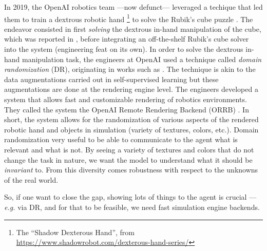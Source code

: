 \documentclass[12pt,a4paper]{article}
\begin{document}
In 2019, the OpenAI robotics team ---now defunct--- leveraged a techique that led
them to train a dextrous robotic hand \footnote{The ``Shadow Dexterous Hand'', from
\url{https://www.shadowrobot.com/dexterous-hand-series/}}
to solve the Rubik's cube puzzle \cite{OpenAI2019-vy}.
The endeavor consisted in first \textit{solving} the dextrous in-hand manipulation of the cube,
which was reported in \cite{OpenAI2018-sm}, before integrating an off-the-shelf Rubik's cube
solver into the system (engineering feat on its own).
In order to solve the dextrous in-hand manipulation task, the engineers at OpenAI used a
technique called \emph{domain randomization} (DR), originating in works such as
\cite{Tobin2017-ir, Tan2018-ux}.
The technique is akin to the data augmentations carried out in self-supervised learning
but these augmentations are done at the rendering engine level. The engineers developed a
system that allows fast and customizable rendering of robotics environments. They called the
system the OpenAI Remote Rendering Backend (ORRB) \cite{Chociej2019-ot}.
In short, the system allows for the randomization of various aspects of the rendered robotic
hand and objects in simulation (variety of textures, colors, etc.).
Domain randomization very useful to be able to communicate to the agent what is relevant and what
is not. By seeing a variety of textures and colors that do not change the task in nature, we
want the model to understand what it should be \emph{invariant} to.
From this diversity comes robustness with respect to the unknowns of the real world.

So, if one want to close the gap, showing lots of things to the agent is crucial
--- \textit{e.g.} via DR, and for that to be feasible, we need fast simulation engine backends.


\begin{comment}
    learning)

problem of character animation in rendering engine is almost identical
    an advantage they have is that game engines do not car as much about contacts being sharp
    usage of dampeners that make contact smooth --making them technically infringe physics
    those are usually very fast and done by game studios (so run on GPU), but clear trade-off

loco sims that are high fidelity and well-vetted are all CPU-based
    GPU-based sims are considerably faster but some operations in locomotion model primitives
    can not be done via big matrix multiplications and are therefore not able to leverage the
    capabilities of GPU, which is why those sims have not been ported to GPU as of yet
    BRAX/MLX might be getting there very soon, so it is very important to keep an eye on those
    dlex from Nvidia, warp
    again: the more we go high-fidelity with real world, the better we can close the sim2real gap

muscles
    OpenSim: CPU
    dflex: GPU
\end{comment}
\end{document}

